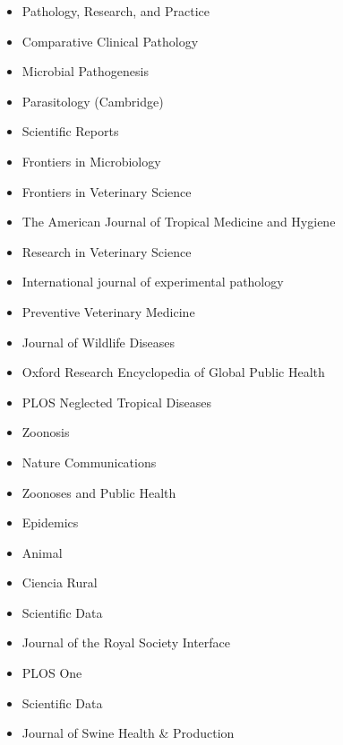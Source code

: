 \documentclass[11pt]{article}
\begin{document}
\begin{itemize}
  \item Pathology, Research, and Practice
  \item Comparative Clinical Pathology
  \item Microbial Pathogenesis 
  \item Parasitology (Cambridge) 
  \item Scientific Reports 
  \item Frontiers in Microbiology 
  \item Frontiers in Veterinary Science
  \item The American Journal of Tropical Medicine and Hygiene
  \item Research in Veterinary Science
  \item International journal of experimental pathology 
  \item Preventive Veterinary Medicine 
  \item Journal of Wildlife Diseases  
  \item Oxford Research Encyclopedia of Global Public Health
  \item PLOS Neglected Tropical Diseases
  \item Zoonosis 
  \item Nature Communications
  \item Zoonoses and Public Health
  \item Epidemics
  \item Animal
  \item Ciencia Rural
  \item Scientific Data
  \item Journal of the Royal Society Interface
  \item PLOS One
  \item Scientific Data
  \item Journal of Swine Health & Production
\end{itemize}
\end{document}
